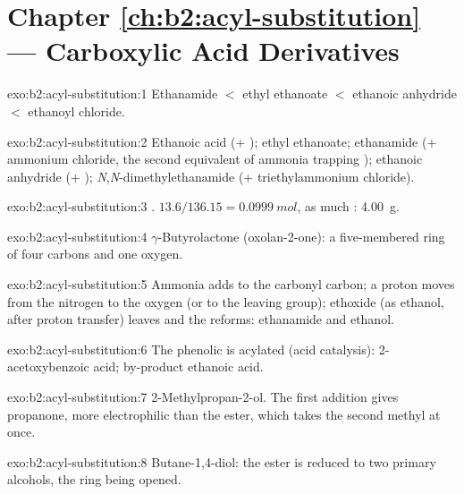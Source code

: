 \section*{Chapter \ref{ch:b2:acyl-substitution} --- Carboxylic Acid Derivatives}

\begin{solution}{exo:b2:acyl-substitution:1}
Ethanamide $<$ ethyl ethanoate $<$ ethanoic anhydride $<$ ethanoyl chloride.
\end{solution}

\begin{solution}{exo:b2:acyl-substitution:2}
Ethanoic acid (+ ); ethyl ethanoate; ethanamide (+ ammonium chloride, the second equivalent
of ammonia trapping ); ethanoic anhydride (+ );
\textit{N},\textit{N}-dimethylethanamide (+ triethylammonium chloride).
\end{solution}

\begin{solution}{exo:b2:acyl-substitution:3}
. $13.6/136.15 = \qty{0.0999}{mol}$, as much
: \qty{4.00}{g}.
\end{solution}

\begin{solution}{exo:b2:acyl-substitution:4}
$\gamma$-Butyrolactone (oxolan-2-one): a five-membered ring of four carbons and one oxygen.
\end{solution}

\begin{solution}{exo:b2:acyl-substitution:5}
Ammonia adds to the carbonyl carbon; a proton moves from the nitrogen to the oxygen (or to the
leaving group); ethoxide (as ethanol, after proton transfer) leaves and the  reforms:
ethanamide and ethanol.
\end{solution}

\begin{solution}{exo:b2:acyl-substitution:6}
The phenolic  is acylated (acid catalysis): 2-acetoxybenzoic acid; by-product ethanoic acid.
\end{solution}

\begin{solution}{exo:b2:acyl-substitution:7}
2-Methylpropan-2-ol. The first addition gives propanone, more electrophilic than the ester, which
takes the second methyl at once.
\end{solution}

\begin{solution}{exo:b2:acyl-substitution:8}
Butane-1,4-diol: the ester is reduced to two primary alcohols, the ring being opened.
\end{solution}

